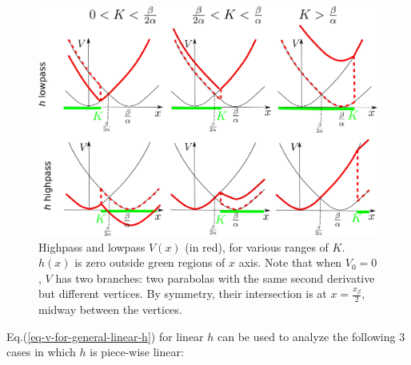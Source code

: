 \begin{figure}[h!]
\centering
\includegraphics[width=4.7in]
{autoregulons/v-low-high-pass.png}
\caption{Highpass
and lowpass $V(x)$ (in red), for various 
ranges of $K$.
$h(x)$ is zero outside green regions of $x$ axis.
Note that when $V_0=0$, $V$ has two branches: two
parabolas with the same second derivative but different vertices. 
By symmetry, their intersection is
at $x=\frac{x_\beta}{2}$,
midway between the vertices.}
\label{fig-v-low-high-pass}
\end{figure}

Eq.(\ref{eq-v-for-general-linear-h})
for linear $h$
can be used to analyze the following
3 cases
in which $h$
is piece-wise linear:

